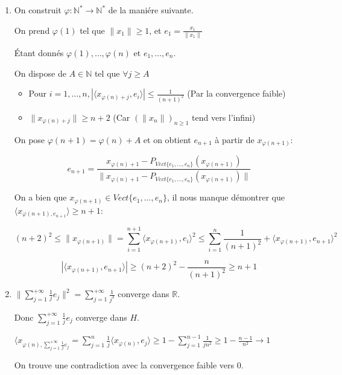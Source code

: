 \documentclass[10pt,a4paper,oneside]{article}
\newenvironment{solution}[1][Solution]{\begin{trivlist}
\item[\hskip \labelsep {\bfseries #1}]}{\end{trivlist}}
\begin{document}
\begin{solution}

\begin{enumerate}

\item
On construit $\varphi: \mathbb{N}^* \rightarrow \mathbb{N}^*$ de la maniére suivante.

On prend $\varphi(1)$ tel que $\|x_1\| \geq 1$, et $e_1 = \frac{x_1}{\|x_1\|}$

Étant donnés $\varphi(1),\ldots,\varphi(n)$ et $e_1,\ldots,e_n$.

On dispose de $A \in \mathbb{N}$ tel que $\forall j \geq A$

\begin{itemize}

\item
Pour $i = 1,\ldots,n, |\langle x_{\varphi(n) + j},e_i \rangle| \leq \frac{1}{(n + 1)^2}$ (Par la convergence faible)

\item
$\|x_{\varphi(n) + j}\| \geq n + 2$ (Car $(\|x_n\|)_{n\geq1}$ tend vers l'infini)
\end{itemize}

On pose $\varphi(n + 1) = \varphi(n) + A$ et on obtient $e_{n + 1}$ à  partir de $x_{\varphi(n + 1)}$:

\[
e_{n+1} = \frac{ x_{\varphi(n) + 1} - P_{Vect\{ e_1,\ldots,e_n \}}(x_{\varphi(n + 1)}) }{\| x_{\varphi(n) + 1} - P_{Vect\{ e_1,\ldots,e_n \}}(x_{\varphi(n + 1)}) \|}
\]

On a bien que $x_{\varphi(n + 1)} \in Vect\{e_1,\ldots,e_n\}$, il nous manque démontrer que $\langle x_{\varphi(n + 1),e_{n + 1}} \rangle \geq n + 1$:

\[
(n+2)^2 \leq \| x_{\varphi(n + 1)} \| = \sum_{i = 1}^{n + 1} \langle x_{\varphi(n + 1)},e_i \rangle^2 \leq \sum_{i = 1}^{n} \frac{1}{(n + 1)^2} + \langle x_{\varphi(n + 1)},e_{n + 1} \rangle^2
\]

\[
|\langle x_{\varphi(n + 1)},e_{n + 1} \rangle| \geq (n + 2)^2 - \frac{n}{(n + 1)^2} \geq n + 1
\]

\item
$\| \sum_{j = 1}^{+\infty} \frac{1}{j}e_j \|^2 = \sum_{j = 1}^{+\infty} \frac{1}{j^2}$ converge dans $\mathbb{R}$.

Donc $\sum_{j = 1}^{+\infty}\frac{1}{j}e_j$ converge dans $H$.

$\langle x_{\varphi(n), \sum_{j = 1}^{+\infty} \frac{1}{j}e_j} = \sum_{j = 1}^n \frac{1}{j} \langle x_{\varphi(n)},e_j \rangle \geq 1 - \sum_{j = 1}^{n - 1}\frac{1}{jn^2} \geq 1 - \frac{n - 1}{n^2} \rightarrow 1$

On trouve une contradiction avec la convergence faible vers 0.

\end{enumerate}

\end{solution}
\end{document}
